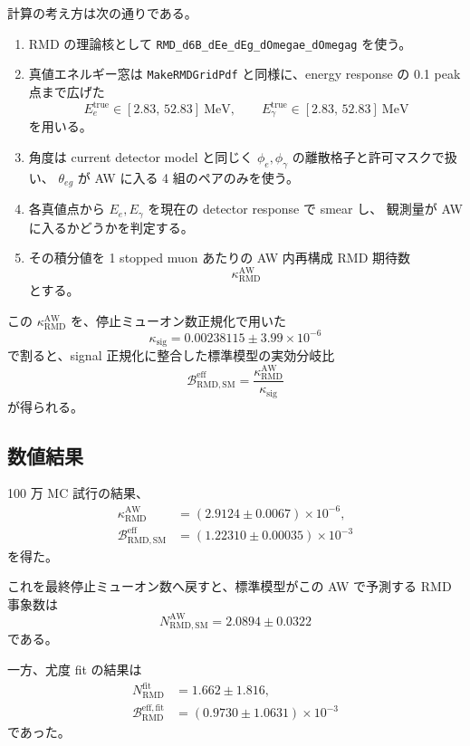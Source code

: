 \documentclass[a4paper,11pt]{jsarticle}
\begin{document}
計算の考え方は次の通りである。
\begin{enumerate}
  \item RMD の理論核として \texttt{RMD\_d6B\_dEe\_dEg\_dOmegae\_dOmegag} を使う。
  \item 真値エネルギー窓は \texttt{MakeRMDGridPdf} と同様に、energy response の 0.1 peak 点まで広げた
        \[
        E_e^{\mathrm{true}}\in[2.83,\,52.83]\ \mathrm{MeV},\qquad
        E_\gamma^{\mathrm{true}}\in[2.83,\,52.83]\ \mathrm{MeV}
        \]
        を用いる。
  \item 角度は current detector model と同じく \(\phi_e,\phi_\gamma\) の離散格子と許可マスクで扱い、
        \(\theta_{eg}\) が AW に入る 4 組のペアのみを使う。
  \item 各真値点から \(E_e,E_\gamma\) を現在の detector response で smear し、
        観測量が AW に入るかどうかを判定する。
  \item その積分値を 1 stopped muon あたりの AW 内再構成 RMD 期待数
        \[
        \kappa_{\mathrm{RMD}}^{\mathrm{AW}}
        \]
        とする。
\end{enumerate}

この \(\kappa_{\mathrm{RMD}}^{\mathrm{AW}}\) を、停止ミューオン数正規化で用いた
\[
\kappa_{\mathrm{sig}} = 0.00238115 \pm 3.99\times10^{-6}
\]
で割ると、signal 正規化に整合した標準模型の実効分岐比
\[
\mathcal{B}_{\mathrm{RMD,SM}}^{\mathrm{eff}}
=
\frac{\kappa_{\mathrm{RMD}}^{\mathrm{AW}}}{\kappa_{\mathrm{sig}}}
\]
が得られる。

\subsection{数値結果}
100 万 MC 試行の結果、
\begin{align}
\kappa_{\mathrm{RMD}}^{\mathrm{AW}}
&=
(2.9124 \pm 0.0067)\times 10^{-6},\\
\mathcal{B}_{\mathrm{RMD,SM}}^{\mathrm{eff}}
&=
(1.22310 \pm 0.00035)\times 10^{-3}
\end{align}
を得た。

これを最終停止ミューオン数へ戻すと、標準模型がこの AW で予測する RMD 事象数は
\begin{equation}
N_{\mathrm{RMD,SM}}^{\mathrm{AW}}
=
2.0894 \pm 0.0322
\end{equation}
である。

一方、尤度 fit の結果は
\begin{align}
N_{\mathrm{RMD}}^{\mathrm{fit}} &= 1.662 \pm 1.816,\\
\mathcal{B}_{\mathrm{RMD}}^{\mathrm{eff,fit}}
&=
(0.9730 \pm 1.0631)\times 10^{-3}
\end{align}
であった。
\end{document}
